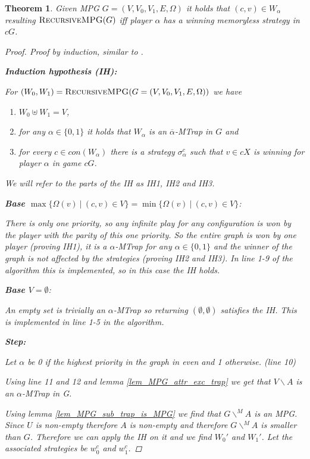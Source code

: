 \documentclass[]{article}
\newtheorem{theorem}{Theorem}[section]
\begin{document}
\begin{theorem}
	Given MPG $G = (V,V_0,V_1,E,\Omega)$ it holds that $(c,v) \in W_\alpha$ resulting $\textsc{RecursiveMPG}(G)$ iff player $\alpha$ has a winning memoryless strategy in $cG$.
	\begin{proof}
		Proof by induction, similar to \cite{ZIELONKA1998135}.
		
		\textbf{Induction hypothesis (IH):}
		
		For $(W_0,W_1) = \textsc{RecursiveMPG}(G = (V,V_0,V_1,E,\Omega))$ we have 
		\begin{enumerate}
			\item $W_0 \uplus W_1 = V$,
			\item for any $\alpha \in \{0,1\}$ it holds that $W_\alpha$ is an $\overline{\alpha}$-MTrap in $G$ and
			\item for every $c\in con(W_\alpha)$ there is a strategy $\sigma_\alpha^c$ such that $v \in cX$ is winning for player $\alpha$ in game $cG$.
		\end{enumerate}
	We will refer to the parts of the IH as IH1, IH2 and IH3.
		
		\textbf{Base $\max\{ \Omega(v)\ |\ (c,v) \in V\} = \min\{ \Omega(v)\ |\ (c,v) \in V\}$}:
		
		There is only one priority, so any infinite play for any configuration is won by the player with the parity of this one priority. So the entire graph is won by one player (proving IH1), it is a $\alpha$-MTrap for any $\alpha \in \{0,1\}$ and the winner of the graph is not affected by the strategies (proving IH2 and IH3). In line 1-9 of the algorithm this is implemented, so in this case the IH holds.
		
		\textbf{Base $V = \emptyset$}:
		
		An empty set is trivially an $\alpha$-MTrap so returning $(\emptyset,\emptyset)$ satisfies the IH. This is implemented in line 1-5 in the algorithm.
		
		\textbf{Step:}
		
		Let $\alpha$ be 0 if the highest priority in the graph in even and 1 otherwise. (line 10)
		
		Using line 11 and 12 and lemma \ref{lem_MPG_attr_exc_trap} we get that $V\backslash A$ is an $\alpha$-MTrap in G.
		
		Using lemma \ref{lem_MPG_sub_trap_is_MPG} we find that $G \backslash^{\!\!M}A$ is an MPG. Since $U$ is non-empty therefore $A$ is non-empty and therefore $G \backslash^{\!\!M}A$ is smaller than $G$. Therefore we can apply the IH on it and we find $W_0'$ and $W_1'$. Let the associated strategies be $w_0^c$ and $w_1^c$.
		

\end{proof}
\end{theorem}
\end{document}
